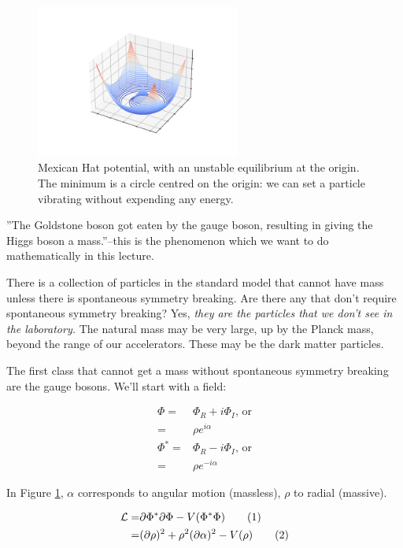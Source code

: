 \documentclass[]{article}
\newcommand\numberthis{\addtocounter{equation}{1}\tag{\theequation}}
\begin{document}
\begin{figure}[H]
	\begin{center}
		\caption[Mexican Hat potential]{Mexican Hat potential, with an unstable equilibrium at the origin.  The minimum is a circle centred on the origin: we can set a particle vibrating without expending any energy.}\label{fig:mexican-hat}
		\includegraphics[width=0.6\textwidth]{mexican-hat}
	\end{center}
\end{figure}

''The Goldstone boson got eaten by the gauge boson, resulting in giving the Higgs boson a mass.''--this is the phenomenon which we want to do mathematically in this lecture.

There is a collection of particles in the standard model that cannot have mass unless there is spontaneous symmetry breaking. Are there any that don't require spontaneous symmetry breaking? Yes, \emph{they are the particles that we don't see in the laboratory.} The natural mass may be very large, up by the Planck mass, beyond the range of our accelerators. These may be the dark matter particles.

The first class that cannot get a mass without spontaneous symmetry breaking are the gauge bosons. We'll start with a field:

\begin{align*}
	\Phi =& \Phi_R + i \Phi_I \text{, or}\\
	=& \rho e^{i \alpha}\\
	\Phi^* =& \Phi_R - i \Phi_I \text{, or}\\
	=& \rho e^{-i \alpha}
\end{align*}

In Figure \ref{fig:mexican-hat}, $\alpha$ corresponds to angular motion (massless), $\rho$  to radial (massive).

\begin{align*}
	\mathcal{L} =& \partial \Phi^* \partial \Phi - V(\Phi^*\Phi)  \numberthis \label{eq:mexican:LagrangeRI}\\
	=& (\partial \rho)^2 + \rho^2 (\partial \alpha)^2 - V(\rho) \numberthis \label{eq:mexican:Lagrange}
\end{align*} 
\end{document}
